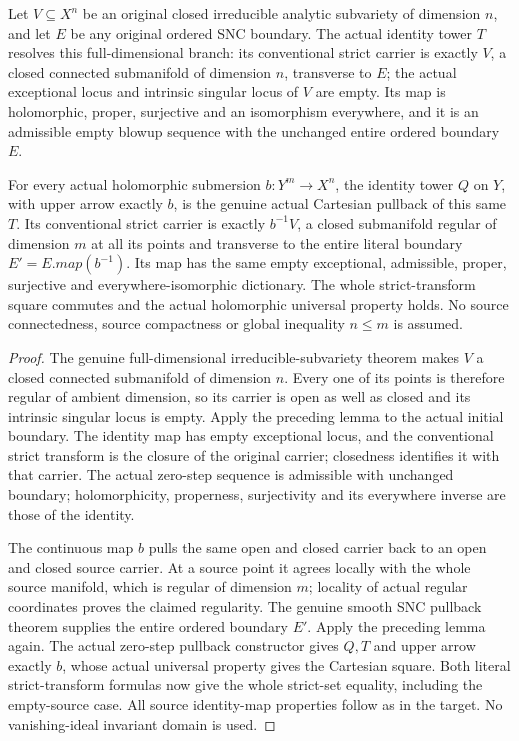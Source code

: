\begin{theorem}
\label{hir:original-full-dimension-identity-smooth-square}
\leanok
Let $V\subseteq X^n$ be an original closed irreducible analytic
subvariety of dimension $n$, and let $E$ be any original ordered SNC
boundary. The actual identity tower $T$ resolves this full-dimensional
branch: its conventional strict carrier is exactly $V$, a closed
connected submanifold of dimension $n$, transverse to $E$; the actual
exceptional locus and intrinsic singular locus of $V$ are empty. Its
map is holomorphic, proper, surjective and an isomorphism everywhere,
and it is an admissible empty blowup sequence with the unchanged
entire ordered boundary $E$.

For every actual holomorphic submersion $b:Y^m\to X^n$, the identity
tower $Q$ on $Y$, with upper arrow exactly $b$, is the genuine actual
Cartesian pullback of this same $T$. Its conventional strict carrier
is exactly $b^{-1}V$, a closed submanifold regular of dimension $m$
at all its points and transverse to the entire literal boundary
$E'=E.map(b^{-1})$. Its map has the same empty exceptional, admissible,
proper, surjective and everywhere-isomorphic dictionary. The whole
strict-transform square commutes and the actual holomorphic universal
property holds. No source connectedness, source compactness or global
inequality $n\le m$ is assumed.
\end{theorem}
\begin{proof}
The genuine full-dimensional irreducible-subvariety theorem makes
$V$ a closed connected submanifold of dimension $n$. Every one of its
points is therefore regular of ambient dimension, so its carrier is
open as well as closed and its intrinsic singular locus is empty.
Apply the preceding lemma to the actual initial boundary. The identity
map has empty exceptional locus, and the conventional strict transform
is the closure of the original carrier; closedness identifies it
with that carrier. The actual zero-step sequence is admissible with
unchanged boundary; holomorphicity, properness, surjectivity and its
everywhere inverse are those of the identity.

The continuous map $b$ pulls the same open and closed carrier back to
an open and closed source carrier. At a source point it agrees locally
with the whole source manifold, which is regular of dimension $m$;
locality of actual regular coordinates proves the claimed regularity.
The genuine smooth SNC pullback theorem supplies the entire ordered
boundary $E'$. Apply the preceding lemma again. The actual zero-step
pullback constructor gives $Q,T$ and upper arrow exactly $b$, whose
actual universal property gives the Cartesian square. Both literal
strict-transform formulas now give the whole strict-set equality,
including the empty-source case. All source identity-map properties
follow as in the target. No vanishing-ideal invariant domain is used.
\end{proof}
